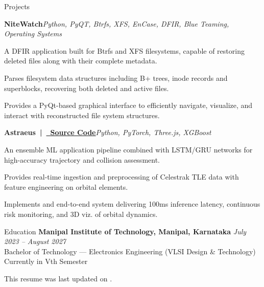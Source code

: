 \documentclass{resume} %
\begin{document}
\begin{rSection}{Projects}

\begin{rSubsection}{\bf NiteWatch}{\em Python, PyQT, Btrfs, XFS, EnCase, DFIR, Blue Teaming, Operating Systems}{}{}
\item A DFIR application built for Btrfs and XFS filesystems, capable of restoring deleted files along with their complete metadata.
\item Parses filesystem data structures including B+ trees, inode records and superblocks, recovering both deleted and active files.
\item Provides a PyQt-based graphical interface to efficiently navigate, visualize, and interact with reconstructed file system structures.
\end{rSubsection}

\begin{rSubsection}{\bf Astraeus~|~\href{https://github.com/Addy-Da-Baddy/Astraeus}{\faGithub~\underline{Source Code}}}{\em Python, PyTorch, Three.js, XGBoost}{}{}
\item An ensemble ML application pipeline combined with LSTM/GRU networks for high-accuracy trajectory and collision assessment.
\item Provides real-time ingestion and preprocessing of Celestrak TLE data with feature engineering on orbital elements.
\item Implements and end-to-end system delivering 100ms inference latency, continuous risk monitoring, and 3D viz. of orbital dynamics.
\end{rSubsection}
\end{rSection}

\begin{rSection}{Education}
    {\bf Manipal Institute of Technology, Manipal, Karnataka} \hfill \textit{July 2023 -- August 2027}  \\
    {Bachelor of Technology --- Electronics Engineering (VLSI Design \& Technology)} \hfill Currently in Vth Semester \\
\end{rSection}

\vspace{-0.8em}
\small \begin{center}This resume was last updated on \DTMnow.\\\end{center}
\end{document}
